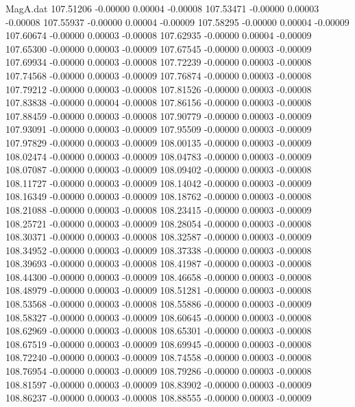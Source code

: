 \begin{filecontents}{MagA.dat}
 107.51206   -0.00000    0.00004   -0.00008
 107.53471   -0.00000    0.00003   -0.00008
 107.55937   -0.00000    0.00004   -0.00009
 107.58295   -0.00000    0.00004   -0.00009
 107.60674   -0.00000    0.00003   -0.00008
 107.62935   -0.00000    0.00004   -0.00009
 107.65300   -0.00000    0.00003   -0.00009
 107.67545   -0.00000    0.00003   -0.00009
 107.69934   -0.00000    0.00003   -0.00008
 107.72239   -0.00000    0.00003   -0.00008
 107.74568   -0.00000    0.00003   -0.00009
 107.76874   -0.00000    0.00003   -0.00008
 107.79212   -0.00000    0.00003   -0.00008
 107.81526   -0.00000    0.00003   -0.00008
 107.83838   -0.00000    0.00004   -0.00008
 107.86156   -0.00000    0.00003   -0.00008
 107.88459   -0.00000    0.00003   -0.00008
 107.90779   -0.00000    0.00003   -0.00009
 107.93091   -0.00000    0.00003   -0.00009
 107.95509   -0.00000    0.00003   -0.00009
 107.97829   -0.00000    0.00003   -0.00009
 108.00135   -0.00000    0.00003   -0.00009
 108.02474   -0.00000    0.00003   -0.00009
 108.04783   -0.00000    0.00003   -0.00009
 108.07087   -0.00000    0.00003   -0.00009
 108.09402   -0.00000    0.00003   -0.00008
 108.11727   -0.00000    0.00003   -0.00009
 108.14042   -0.00000    0.00003   -0.00009
 108.16349   -0.00000    0.00003   -0.00009
 108.18762   -0.00000    0.00003   -0.00008
 108.21088   -0.00000    0.00003   -0.00008
 108.23415   -0.00000    0.00003   -0.00009
 108.25721   -0.00000    0.00003   -0.00009
 108.28054   -0.00000    0.00003   -0.00008
 108.30371   -0.00000    0.00003   -0.00008
 108.32587   -0.00000    0.00003   -0.00009
 108.34952   -0.00000    0.00003   -0.00009
 108.37338   -0.00000    0.00003   -0.00008
 108.39693   -0.00000    0.00003   -0.00008
 108.41987   -0.00000    0.00003   -0.00008
 108.44300   -0.00000    0.00003   -0.00009
 108.46658   -0.00000    0.00003   -0.00008
 108.48979   -0.00000    0.00003   -0.00009
 108.51281   -0.00000    0.00003   -0.00008
 108.53568   -0.00000    0.00003   -0.00008
 108.55886   -0.00000    0.00003   -0.00009
 108.58327   -0.00000    0.00003   -0.00009
 108.60645   -0.00000    0.00003   -0.00008
 108.62969   -0.00000    0.00003   -0.00008
 108.65301   -0.00000    0.00003   -0.00008
 108.67519   -0.00000    0.00003   -0.00009
 108.69945   -0.00000    0.00003   -0.00008
 108.72240   -0.00000    0.00003   -0.00009
 108.74558   -0.00000    0.00003   -0.00008
 108.76954   -0.00000    0.00003   -0.00009
 108.79286   -0.00000    0.00003   -0.00008
 108.81597   -0.00000    0.00003   -0.00009
 108.83902   -0.00000    0.00003   -0.00009
 108.86237   -0.00000    0.00003   -0.00008
 108.88555   -0.00000    0.00003   -0.00009

\end{filecontents}
